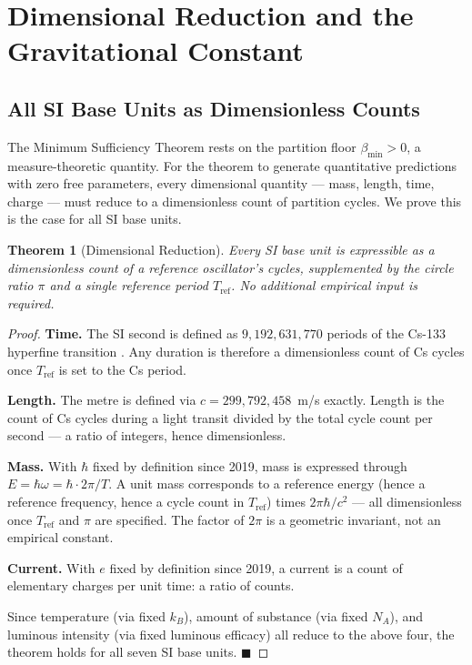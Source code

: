 \documentclass[12pt, a4paper]{article}
\theoremstyle{plain}
\newtheorem{theorem}{Theorem}[section]
\theoremstyle{definition}
\theoremstyle{remark}
\newcommand{\bmin}{\beta_{\min}}
\newcommand{\qed}{\hfill$\blacksquare$}
\begin{document}
\section{Dimensional Reduction and the Gravitational Constant}
\label{sec:gravity}

\subsection{All SI Base Units as Dimensionless Counts}

The Minimum Sufficiency Theorem rests on the partition floor $\bmin > 0$, a
measure-theoretic quantity. For the theorem to generate quantitative predictions
with zero free parameters, every dimensional quantity --- mass, length, time,
charge --- must reduce to a dimensionless count of partition cycles. We prove
this is the case for all SI base units.

\begin{theorem}[Dimensional Reduction]
\label{thm:dimred}
Every SI base unit is expressible as a dimensionless count of a reference
oscillator's cycles, supplemented by the circle ratio $\pi$ and a single
reference period $T_{\mathrm{ref}}$. No additional empirical input is required.
\end{theorem}

\begin{proof}
\textbf{Time.} The SI second is defined as $9{,}192{,}631{,}770$ periods of the
Cs-133 hyperfine transition \citep{codata2018}. Any duration is therefore a
dimensionless count of Cs cycles once $T_{\mathrm{ref}}$ is set to the Cs
period.

\textbf{Length.} The metre is defined via $c = 299{,}792{,}458$~m/s exactly.
Length is the count of Cs cycles during a light transit divided by the total
cycle count per second --- a ratio of integers, hence dimensionless.

\textbf{Mass.} With $\hbar$ fixed by definition since 2019, mass is expressed
through $E = \hbar\omega = \hbar\cdot 2\pi/T$. A unit mass corresponds to a
reference energy (hence a reference frequency, hence a cycle count in $T_{\mathrm{ref}}$)
times $2\pi\hbar/c^2$ --- all dimensionless once $T_{\mathrm{ref}}$ and $\pi$
are specified. The factor of $2\pi$ is a geometric invariant, not an empirical
constant.

\textbf{Current.} With $e$ fixed by definition since 2019, a current is a count
of elementary charges per unit time: a ratio of counts.

Since temperature (via fixed $k_B$), amount of substance (via fixed $N_A$), and
luminous intensity (via fixed luminous efficacy) all reduce to the above four,
the theorem holds for all seven SI base units. \qed
\end{proof}
\end{document}
